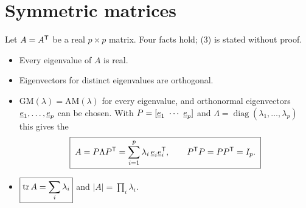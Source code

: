 \section{Symmetric matrices}

\begin{theorem}
Let $A=A^{\mathsf{T}}$ be a real $p\times p$ matrix. Four facts hold; (3) is stated without proof.
\begin{itemize}
  \item[(1)] Every eigenvalue of $A$ is real.
  \item[(2)] Eigenvectors for distinct eigenvalues are orthogonal.
  \item[(3)] $\text{GM}(\lambda)=\text{AM}(\lambda)$ for every eigenvalue, and orthonormal eigenvectors $\underline{e}_1,\dots,\underline{e}_p$ can be chosen. With $P=[\vect{e}_1\ \cdots\ \vect{e}_p]$ and $\Lambda=\operatorname{diag}(\lambda_1,\dots,\lambda_p)$ this gives the 
  \[
    \boxed{\;A=P\Lambda P^{\mathsf{T}}=\sum_{i=1}^p\lambda_i\,\underline{e}_i\underline{e}_i^{\mathsf{T}},\qquad P^{\mathsf{T}} P=PP^{\mathsf{T}}=I_p.\;}
  \]
  \item[(4)] $\boxed{\operatorname{tr} A=\sum_i\lambda_i}$ and $\boxed{|A|=\prod_i\lambda_i}$.
\end{itemize}
\end{theorem}
